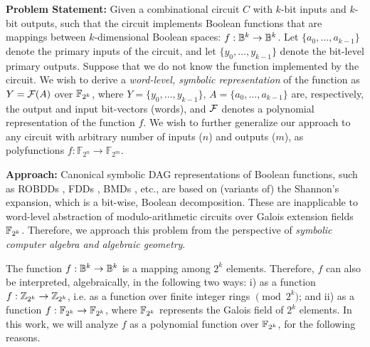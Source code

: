 {\bf Problem Statement:} Given a combinational circuit $C$ with
$k$-bit inputs and $k$-bit outputs, such that the circuit implements 
Boolean functions that are mappings between $k$-dimensional Boolean
spaces: $f: {\mathbb{B}}^k \rightarrow {\mathbb{B}}^k$. Let $\{a_0, \dots, a_{k-1}\}$
denote the primary inputs of the circuit, and let $\{y_0, \dots,
y_{k-1}\}$ denote the bit-level primary outputs. Suppose that we do
not know the function implemented by the circuit. We wish to
derive a {\it word-level, symbolic representation} of the function as
$Y = {\mathcal{F}}(A)$ over ${\mathbb{F}}_{2^k}$, where $Y = \{y_0, \dots, y_{k-1}\}$, $A =
\{a_0, \dots,  a_{k-1}\}$ are, respectively, the output and input
bit-vectors (words), and ${\mathcal{F}}$ denotes a polynomial representation of
the function $f$. We wish to further generalize our approach to any
circuit with arbitrary number  of inputs ($n$) and outputs ($m$), as
polyfunctions $f: {\mathbb{F}}_{2^n} \rightarrow
{\mathbb{F}}_{2^m}$. 

{\bf Approach:} Canonical symbolic DAG 
representations of Boolean functions, such
as ROBDDs \cite{BRYA86}, FDDs \cite{okfdd}, BMDs \cite{bmd}, etc., are
based on (variants of) the Shannon's  expansion, which is a bit-wise,
Boolean decomposition. These are inapplicable to 
word-level abstraction of modulo-arithmetic circuits over Galois
extension fields ${\mathbb{F}}_{2^k}$. Therefore, we approach this problem from the
perspective of {\it symbolic computer algebra and algebraic geometry}. 

The function $f: {\mathbb{B}}^k \rightarrow {\mathbb{B}}^k$ is a
mapping among $2^k$ elements. Therefore, $f$ can also be interpreted,
algebraically, in the following two ways: i) as a function $f:
{\mathbb{Z}}_{2^k} \rightarrow {\mathbb{Z}}_{2^k}$, i.e. as a function over finite integer
rings $\pmod{ 2^k}$; and ii) as a function $f: {\mathbb{F}}_{2^k} \rightarrow {\mathbb{F}}_{2^k}$,
where ${\mathbb{F}}_{2^k}$ represents the Galois field of $2^k$
elements. In this work, we will analyze $f$ as a polynomial function
over ${\mathbb{F}}_{2^k}$, for the following reasons. 

